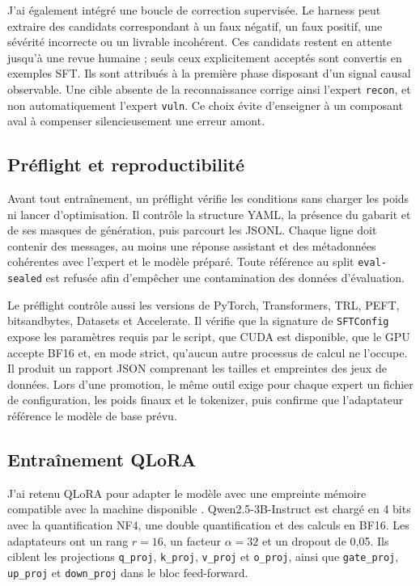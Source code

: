 J'ai également intégré une boucle de correction supervisée. Le harness peut
extraire des candidats correspondant à un faux négatif, un faux positif, une
sévérité incorrecte ou un livrable incohérent. Ces candidats restent en attente
jusqu'à une revue humaine ; seuls ceux explicitement acceptés sont convertis en
exemples SFT. Ils sont attribués à la première phase disposant d'un signal causal
observable. Une cible absente de la reconnaissance corrige ainsi l'expert
\texttt{\footnotesize recon}, et non automatiquement l'expert \texttt{\footnotesize vuln}. Ce choix évite
d'enseigner à un composant aval à compenser silencieusement une erreur amont.

\subsection{Préflight et reproductibilité}

Avant tout entraînement, un préflight vérifie les conditions sans charger les
poids ni lancer d'optimisation. Il contrôle la structure YAML, la présence du
gabarit et de ses masques de génération, puis parcourt les JSONL. Chaque ligne
doit contenir des messages, au moins une réponse assistant et des métadonnées
cohérentes avec l'expert et le modèle préparé. Toute référence au split
\texttt{\footnotesize eval-sealed} est refusée afin d'empêcher une contamination des données
d'évaluation.

Le préflight contrôle aussi les versions de PyTorch, Transformers, TRL, PEFT,
bitsandbytes, Datasets et Accelerate. Il vérifie que la signature de
\texttt{\footnotesize SFTConfig} expose les paramètres requis par le script, que CUDA est
disponible, que le GPU accepte BF16 et, en mode strict, qu'aucun autre processus
de calcul ne l'occupe. Il produit un rapport JSON comprenant les tailles et
empreintes des jeux de données. Lors d'une promotion, le même outil exige pour
chaque expert un fichier de configuration, les poids finaux et le tokenizer,
puis confirme que l'adaptateur référence le modèle de base prévu.


\subsection{Entraînement QLoRA}

J'ai retenu QLoRA pour adapter le modèle avec une empreinte mémoire compatible
avec la machine disponible \cite{dettmers2023qlora}. Qwen2.5-3B-Instruct est
chargé en 4 bits avec la quantification NF4, une double quantification et des
calculs en BF16. Les adaptateurs ont un rang \(r=16\), un facteur
\(\alpha=32\) et un dropout de 0,05. Ils ciblent les projections
\texttt{\footnotesize q\_proj}, \texttt{\footnotesize k\_proj}, \texttt{\footnotesize v\_proj} et
\texttt{\footnotesize o\_proj}, ainsi que \texttt{\footnotesize gate\_proj}, \texttt{\footnotesize up\_proj} et
\texttt{\footnotesize down\_proj} dans le bloc feed-forward.

